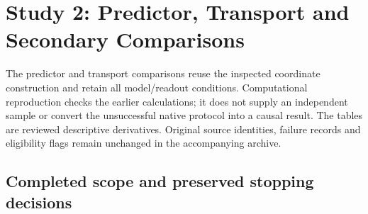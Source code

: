 \section{Study 2: Predictor, Transport and Secondary Comparisons}
\label{app:reproduction}
The predictor and transport comparisons reuse the inspected coordinate construction and retain all model/readout conditions. Computational reproduction checks the earlier calculations; it does not supply an independent sample or convert the unsuccessful native protocol into a causal result. The tables are reviewed descriptive derivatives. Original source identities, failure records and eligibility flags remain unchanged in the accompanying archive.



\subsection{Completed scope and preserved stopping decisions}

